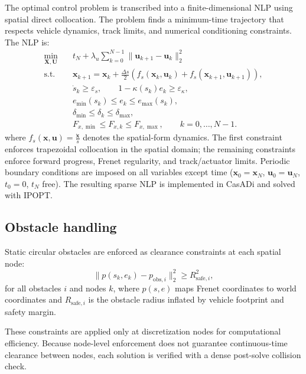 \documentclass{article}
\begin{document}
The optimal control problem is transcribed into a finite-dimensional NLP using spatial direct collocation. The problem finds a minimum-time trajectory that respects vehicle dynamics, track limits, and numerical conditioning constraints. The NLP is:
\begin{equation}
\begin{aligned}
\min_{\mathbf{X},\mathbf{U}}\quad
& t_N + \lambda_u \sum_{k=0}^{N-1}\|\mathbf{u}_{k+1}-\mathbf{u}_k\|_2^2\\
\text{s.t.}\quad
& \mathbf{x}_{k+1}
=\mathbf{x}_k+\frac{\Delta s}{2}\left(f_s(\mathbf{x}_k,\mathbf{u}_k)+f_s(\mathbf{x}_{k+1},\mathbf{u}_{k+1})\right),\\
& \dot{s}_k \ge \varepsilon_s,\qquad
1-\kappa(s_k)e_k \ge \varepsilon_\kappa,\\
& e_{\min}(s_k)\le e_k\le e_{\max}(s_k),\\
& \delta_{\min}\le\delta_k\le\delta_{\max},\\
& F_{x,\min}\le F_{x,k}\le F_{x,\max},\qquad k=0,\dots,N-1.
\end{aligned}
\end{equation}
where $f_s(\mathbf{x},\mathbf{u})=\frac{\dot{\mathbf{x}}}{\dot{s}}$ denotes the spatial-form dynamics. 
The first constraint enforces trapezoidal collocation in the spatial domain; the remaining constraints enforce forward progress, Frenet regularity, and track/actuator limits. Periodic boundary conditions are imposed on all variables except time ($\mathbf{x}_0=\mathbf{x}_N$, $\mathbf{u}_0=\mathbf{u}_N$, $t_0=0$, $t_N$ free). The resulting sparse NLP is implemented in CasADi and solved with IPOPT.

\subsection{Obstacle handling}

Static circular obstacles are enforced as clearance constraints at each spatial node:
\begin{equation}
\|p(s_k,e_k)-p_{\text{obs},i}\|_2^2
\ge
R_{\text{safe},i}^2,
\end{equation}
for all obstacles $i$ and nodes $k$, where $p(s,e)$ maps Frenet coordinates to world coordinates and 
$R_{\text{safe},i}$ is the obstacle radius inflated by vehicle footprint and safety margin.

These constraints are applied only at discretization nodes for computational efficiency. 
Because node-level enforcement does not guarantee continuous-time clearance between nodes, 
each solution is verified with a dense post-solve collision check.
\end{document}
